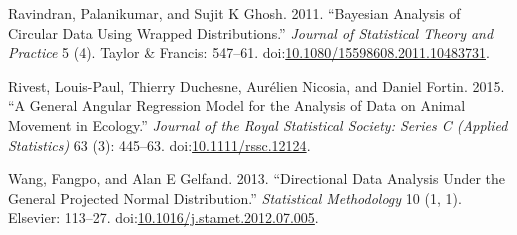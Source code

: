 \documentclass[11pt,]{article}
\begin{document}
\hypertarget{ref-ravindran2011bayesian}{}
Ravindran, Palanikumar, and Sujit K Ghosh. 2011. ``Bayesian Analysis of
Circular Data Using Wrapped Distributions.'' \emph{Journal of
Statistical Theory and Practice} 5 (4). Taylor \& Francis: 547--61.
doi:\href{https://doi.org/10.1080/15598608.2011.10483731}{10.1080/15598608.2011.10483731}.

\hypertarget{ref-rivest2015general}{}
Rivest, Louis-Paul, Thierry Duchesne, Aurélien Nicosia, and Daniel
Fortin. 2015. ``A General Angular Regression Model for the Analysis of
Data on Animal Movement in Ecology.'' \emph{Journal of the Royal
Statistical Society: Series C (Applied Statistics)} 63 (3): 445--63.
doi:\href{https://doi.org/10.1111/rssc.12124}{10.1111/rssc.12124}.

\hypertarget{ref-wang2012directional}{}
Wang, Fangpo, and Alan E Gelfand. 2013. ``Directional Data Analysis
Under the General Projected Normal Distribution.'' \emph{Statistical
Methodology} 10 (1, 1). Elsevier: 113--27.
doi:\href{https://doi.org/10.1016/j.stamet.2012.07.005}{10.1016/j.stamet.2012.07.005}.

\newpage
\end{document}
